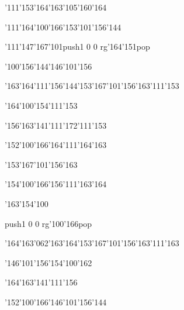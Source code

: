 \null\vfill\ipa\centerline{\enskip\char'111\char'153\enskip\enskip\enskip\enskip\enskip\char'164\char'163\char'105\char'160\char'164}\medskip\centerline{\enskip\char'111\enskip\char'164\char'100\char'166\enskip\char'153\char'101\char'156\char'144\enskip\enskip\enskip}\medskip\centerline{\enskip\char'111\enskip\char'147\char'167\char'101\enskip\enskip\enskip\enskip\pdfcolorstack\match push{1 0 0 rg}\char'164\char'151\pdfcolorstack\match pop{}}\medskip\centerline{\enskip\enskip\enskip\enskip\char'100\char'156\char'144\enskip\enskip\enskip\enskip\char'146\char'101\char'156}\medskip\centerline{\enskip\enskip\enskip\enskip\enskip\char'163\char'164\char'111\char'156\char'144\enskip\char'153\char'167\char'101\char'156\char'163\enskip\char'111\char'153}\medskip\centerline{\enskip\enskip\enskip\enskip\enskip\enskip\enskip\enskip\enskip\enskip\enskip\char'164\char'100\char'154\enskip\char'111\char'153}\medskip\centerline{\enskip\char'156\char'163\char'141\char'111\char'172\enskip\enskip\enskip\enskip\enskip\enskip\enskip\enskip\enskip\enskip\char'111\char'153}\medskip\centerline{\enskip\enskip\enskip\enskip\enskip\enskip\enskip\enskip\enskip\enskip\enskip\enskip}\medskip\centerline{\enskip\enskip\enskip\enskip\enskip\enskip\enskip\char'152\char'100\char'166\enskip\char'164\char'111\char'164\char'163}\medskip\vfill\footline{\hfil\tt\folio\hfil}\eject
\null\vfill\ipa\centerline{\enskip\enskip\enskip\enskip\enskip\enskip\enskip\enskip\char'153\char'167\char'101\char'156\char'163}\medskip\centerline{\enskip\enskip\enskip\char'154\char'100\char'166\enskip\char'156\char'111\char'163\char'164\enskip\enskip\enskip}\medskip\centerline{\enskip\enskip\enskip\char'163\char'154\char'100\enskip\enskip\enskip\enskip\enskip\enskip}\medskip\centerline{\enskip\pdfcolorstack\match push{1 0 0 rg}\char'100\char'166\pdfcolorstack\match pop{}\enskip\enskip\enskip\enskip\enskip\enskip\enskip\enskip\enskip\enskip\enskip}\medskip\centerline{\enskip\enskip\enskip\enskip\enskip\char'164\char'163\char'062\char'163\char'164\enskip\char'153\char'167\char'101\char'156\char'163\enskip\char'111\char'163}\medskip\centerline{\enskip\enskip\enskip\char'146\char'101\char'156\enskip\enskip\enskip\enskip\enskip\char'154\char'100\char'162\enskip\enskip\enskip}\medskip\centerline{\enskip\char'164\char'163\char'141\char'111\char'156\enskip\enskip\enskip\enskip\enskip\enskip\enskip\enskip\enskip\enskip\enskip\enskip}\medskip\centerline{\enskip\enskip\enskip\enskip\enskip\enskip\enskip\enskip\enskip\enskip\enskip\enskip}\medskip\centerline{\enskip\enskip\enskip\enskip\enskip\enskip\enskip\char'152\char'100\char'166\enskip\char'146\char'101\char'156\char'144}\medskip\vfill\footline{\hfil\tt\folio\hfil}\eject
